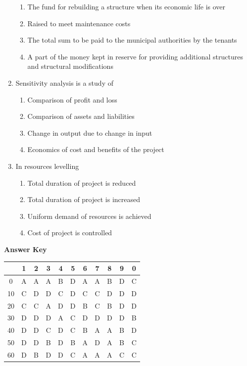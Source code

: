 \documentclass[11pt,a4paper]{article}
\begin{document}
\begin{enumerate}
\begin{enumerate}[label=\Alph*.]
\item{The fund for rebuilding a structure when its economic life is over}
\item{Raised to meet maintenance costs}
\item{The total sum to be paid to the municipal authorities by the tenants}
\item{A part of the money kept in reserve for providing additional structures and structural modifications}
\end{enumerate}
\item{Sensitivity analysis is a study of}
\begin{enumerate}[label=\Alph*.]
\item{Comparison of profit and loss}
\item{Comparison of assets and liabilities}
\item{Change in output due to change in input}
\item{Economics of cost and benefits of the project}
\end{enumerate}
\item{In resources levelling}
\begin{enumerate}[label=\Alph*.]
\item{Total duration of project is reduced}
\item{Total duration of project is increased}
\item{Uniform demand of resources is achieved}
\item{Cost of project is controlled}
\end{enumerate}
\end{enumerate}
\textbf{Answer Key}
\begin{tabular}{ | c | c c c c c c c c c c | }
\hline
 & 1 & 2 & 3 & 4 & 5 & 6 & 7 & 8 & 9 & 0 \\
\hline
0 & A & A & A & B & D & A & A & B & D & C \\
10 & C & D & D & C & D & C & C & D & D & D \\
20 & C & C & A & D & D & B & C & B & D & D \\
30 & D & D & D & A & C & D & D & D & D & B \\
40 & D & D & C & D & C & B & A & A & B & D \\
50 & D & D & B & D & B & A & D & A & B & C \\
60 & D & B & D & D & C & A & A & A & C & C \\
\hline
\end{tabular}
\clearpage
\end{document}
